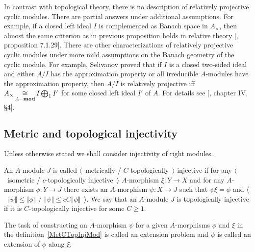 In contrast with topological theory, there is no description of relatively
projective cyclic modules. There are partial answers under additional
assumptions. For example, if a closed left ideal $I$ is complemented as Banach space in
$A_\times$, then almost the same criterion as in previous proposition holds in
relative theory [\cite{HelBanLocConvAlg}, proposition 7.1.29]. There are other
characterizations of relatively projective cyclic modules under more mild
assumptions on the Banach geometry of the cyclic module. For example, Selivanov 
proved that if $I$ is a closed two-sided ideal and either $A/I$ has 
the approximation property or all irreducible $A$-modules have the approximation 
property, then $A/I$ is relatively projective 
iff $A_\times\mathop{\mathbin{\cong}}\limits_{A-\mathbf{mod}}I\bigoplus_1 I'$ for some closed left 
ideal $I'$ of $A$. For details see [\cite{HelHomolBanTopAlg}, chapter IV, \S 4].


\subsection{
    Metric and topological injectivity}\label{SubSectionMetricAndTopologicalInjectivity}

Unless otherwise stated we shall consider injectivity of right modules.

\begin{definition}\label{MetCTopInjMod} 
An $A$-module $J$ is 
called $\langle$~metrically / $C$-topologically~$\rangle$ injective if for any 
$\langle$~isometric / $c$-topologically injective~$\rangle$
$A$-morphism $\xi:Y\to X$ and for any $A$-morphism $\phi:Y\to J$ 
there exists an $A$-morphism $\psi:X\to J$ such that $\psi\xi=\phi$  and
$\langle$~$\Vert\psi\Vert\leq\Vert\phi\Vert$ / 
$\Vert \psi\Vert\leq c C\Vert\phi\Vert$~$\rangle$. We say that an $A$-module 
$J$ is topologically injective if it is $C$-topologically injective for 
some $C\geq 1$.
\end{definition}

The task of constructing an $A$-morphism $\psi$ for a given $A$-morphisms $\phi$ 
and $\xi$ in the definition~\ref{MetCTopInjMod} is called an extension problem 
and $\psi$ is called an extension of $\phi$ along $\xi$.

